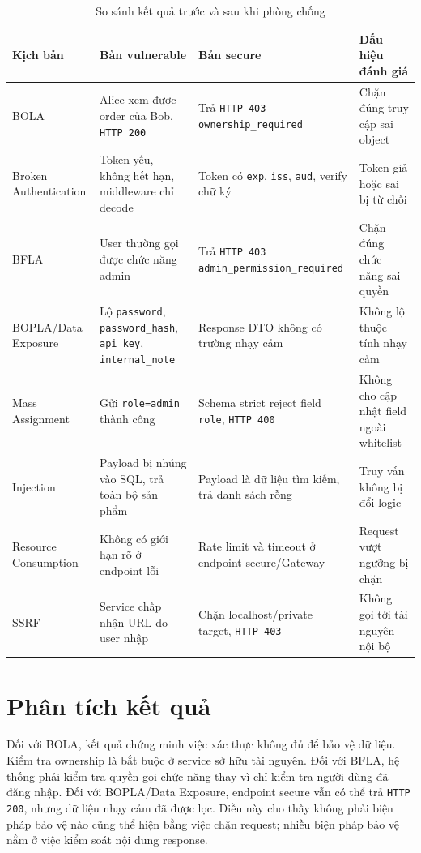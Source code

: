 \documentclass[14pt,a4paper]{extreport}
\begin{document}
\begin{longtable}{p{3.3cm}p{4.2cm}p{4.2cm}p{2.6cm}}
\caption{So sánh kết quả trước và sau khi phòng chống}\\
\toprule
\textbf{Kịch bản} & \textbf{Bản vulnerable} & \textbf{Bản secure} & \textbf{Dấu hiệu đánh giá}\\
\midrule
BOLA & Alice xem được order của Bob, \texttt{HTTP 200} & Trả \texttt{HTTP 403 ownership\_required} & Chặn đúng truy cập sai object\\
Broken Authentication & Token yếu, không hết hạn, middleware chỉ decode & Token có \texttt{exp}, \texttt{iss}, \texttt{aud}, verify chữ ký & Token giả hoặc sai bị từ chối\\
BFLA & User thường gọi được chức năng admin & Trả \texttt{HTTP 403 admin\_permission\_required} & Chặn đúng chức năng sai quyền\\
BOPLA/Data Exposure & Lộ \texttt{password}, \texttt{password\_hash}, \texttt{api\_key}, \texttt{internal\_note} & Response DTO không có trường nhạy cảm & Không lộ thuộc tính nhạy cảm\\
Mass Assignment & Gửi \texttt{role=admin} thành công & Schema strict reject field \texttt{role}, \texttt{HTTP 400} & Không cho cập nhật field ngoài whitelist\\
Injection & Payload bị nhúng vào SQL, trả toàn bộ sản phẩm & Payload là dữ liệu tìm kiếm, trả danh sách rỗng & Truy vấn không bị đổi logic\\
Resource Consumption & Không có giới hạn rõ ở endpoint lỗi & Rate limit và timeout ở endpoint secure/Gateway & Request vượt ngưỡng bị chặn\\
SSRF & Service chấp nhận URL do user nhập & Chặn localhost/private target, \texttt{HTTP 403} & Không gọi tới tài nguyên nội bộ\\
\bottomrule
\end{longtable}

\section{Phân tích kết quả}
Đối với BOLA, kết quả chứng minh việc xác thực không đủ để bảo vệ dữ liệu. Kiểm tra ownership là bắt buộc ở service sở hữu tài nguyên. Đối với BFLA, hệ thống phải kiểm tra quyền gọi chức năng thay vì chỉ kiểm tra người dùng đã đăng nhập. Đối với BOPLA/Data Exposure, endpoint secure vẫn có thể trả \texttt{HTTP 200}, nhưng dữ liệu nhạy cảm đã được lọc. Điều này cho thấy không phải biện pháp bảo vệ nào cũng thể hiện bằng việc chặn request; nhiều biện pháp bảo vệ nằm ở việc kiểm soát nội dung response.
\end{document}
